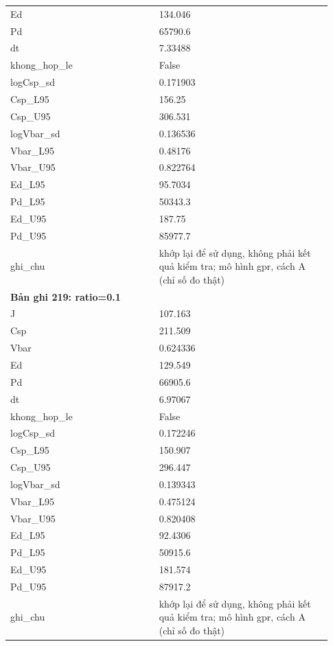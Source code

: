 \begin{longtable}{p{0.43\linewidth}p{0.50\linewidth}}
Ed & 134.046 \\
Pd & 65790.6 \\
dt & 7.33488 \\
khong\_\allowbreak hop\_\allowbreak le & False \\
logCsp\_\allowbreak sd & 0.171903 \\
Csp\_\allowbreak L95 & 156.25 \\
Csp\_\allowbreak U95 & 306.531 \\
logVbar\_\allowbreak sd & 0.136536 \\
Vbar\_\allowbreak L95 & 0.48176 \\
Vbar\_\allowbreak U95 & 0.822764 \\
Ed\_\allowbreak L95 & 95.7034 \\
Pd\_\allowbreak L95 & 50343.3 \\
Ed\_\allowbreak U95 & 187.75 \\
Pd\_\allowbreak U95 & 85977.7 \\
ghi\_\allowbreak chu & khớp lại để sử dụng, không phải kết quả kiểm tra; mô hình gpr, cách A (chỉ số đo thật) \\
\midrule
\multicolumn{2}{p{0.95\linewidth}}{\textbf{Bản ghi 219: ratio=0.1}} \\
J & 107.163 \\
Csp & 211.509 \\
Vbar & 0.624336 \\
Ed & 129.549 \\
Pd & 66905.6 \\
dt & 6.97067 \\
khong\_\allowbreak hop\_\allowbreak le & False \\
logCsp\_\allowbreak sd & 0.172246 \\
Csp\_\allowbreak L95 & 150.907 \\
Csp\_\allowbreak U95 & 296.447 \\
logVbar\_\allowbreak sd & 0.139343 \\
Vbar\_\allowbreak L95 & 0.475124 \\
Vbar\_\allowbreak U95 & 0.820408 \\
Ed\_\allowbreak L95 & 92.4306 \\
Pd\_\allowbreak L95 & 50915.6 \\
Ed\_\allowbreak U95 & 181.574 \\
Pd\_\allowbreak U95 & 87917.2 \\
ghi\_\allowbreak chu & khớp lại để sử dụng, không phải kết quả kiểm tra; mô hình gpr, cách A (chỉ số đo thật) \\

\end{longtable}
